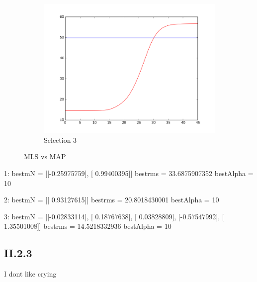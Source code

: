 \documentclass{article}
\begin{document}
\begin{figure}[!ht]
\begin{subfigure}[b]{0.5\textwidth}
        \includegraphics[width=\textwidth]{Part2/II223.png}
        \caption{Selection 3}
    \end{subfigure}
    \caption{MLS vs MAP}
    \label{fig:II22}
\end{figure}



1:
bestmN = [[-0.25975759], [ 0.99400395]]
bestrms = 33.6875907352
bestAlpha = 10


2:
bestmN = [[ 0.93127615]]
bestrms = 20.8018430001
bestAlpha = 10

3:
bestmN = [[-0.02833114], [ 0.18767638], [ 0.03828809], [-0.57547992], [ 1.35501008]]
bestrms = 14.5218332936
bestAlpha = 10


\subsection{II.2.3}

I dont like crying
\end{document}
